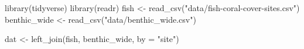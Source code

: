 \documentclass[
  letterpaper,
  DIV=11,
  numbers=noendperiod]{scrreprt}
\newenvironment{Shaded}{\begin{snugshade}}{\end{snugshade}}
\newcommand{\AttributeTok}[1]{\textcolor[rgb]{0.40,0.45,0.13}{#1}}
\newcommand{\FunctionTok}[1]{\textcolor[rgb]{0.28,0.35,0.67}{#1}}
\newcommand{\NormalTok}[1]{\textcolor[rgb]{0.00,0.23,0.31}{#1}}
\newcommand{\OtherTok}[1]{\textcolor[rgb]{0.00,0.23,0.31}{#1}}
\newcommand{\StringTok}[1]{\textcolor[rgb]{0.13,0.47,0.30}{#1}}
\begin{document}
\begin{Shaded}
\begin{Highlighting}[]
\FunctionTok{library}\NormalTok{(tidyverse)}
\FunctionTok{library}\NormalTok{(readr)}
\NormalTok{fish }\OtherTok{\textless{}{-}} \FunctionTok{read\_csv}\NormalTok{(}\StringTok{"data/fish{-}coral{-}cover{-}sites.csv"}\NormalTok{)}
\NormalTok{benthic\_wide }\OtherTok{\textless{}{-}} \FunctionTok{read\_csv}\NormalTok{(}\StringTok{"data/benthic\_wide.csv"}\NormalTok{)}

\NormalTok{dat }\OtherTok{\textless{}{-}} \FunctionTok{left\_join}\NormalTok{(fish, benthic\_wide, }\AttributeTok{by =} \StringTok{"site"}\NormalTok{)}
\end{Highlighting}
\end{Shaded}
\end{document}
